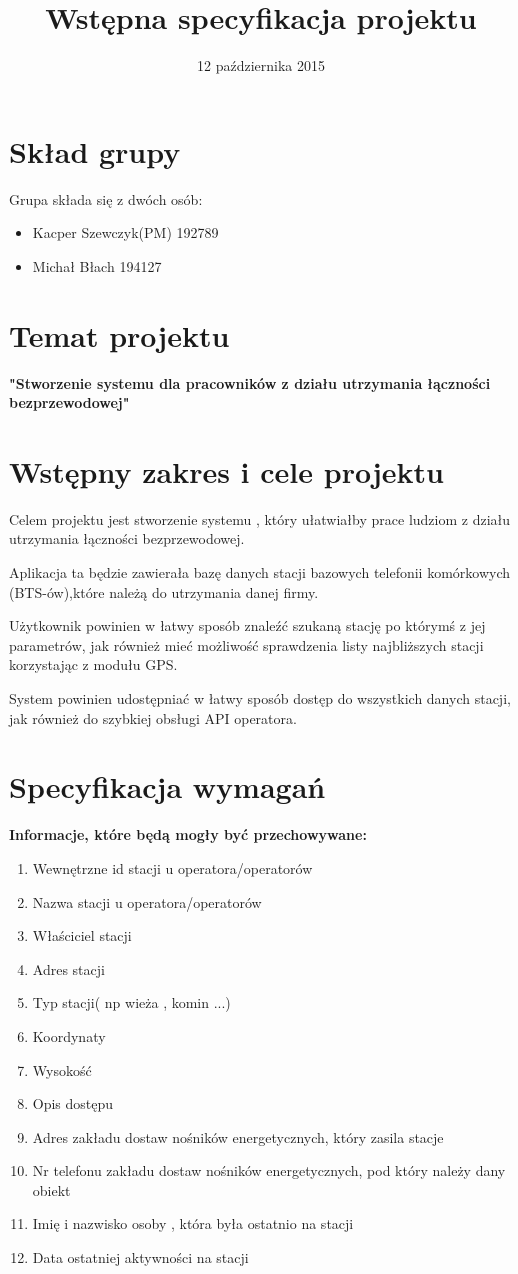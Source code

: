 \documentclass[12pt]{article}
\title{Wstępna specyfikacja projektu}
\date{12 października 2015}
\begin{document}
\maketitle

\section{Skład grupy}
Grupa składa się z dwóch osób:
\begin{itemize}
\item Kacper Szewczyk(PM) 192789
\item Michał Błach 194127
\end{itemize}
\section{Temat projektu}
\textbf{"Stworzenie systemu dla pracowników z działu utrzymania łączności bezprzewodowej"}
\section{Wstępny zakres i cele projektu}
Celem projektu jest stworzenie systemu , który ułatwiałby prace ludziom z działu utrzymania łączności bezprzewodowej.

Aplikacja ta będzie zawierała bazę danych stacji bazowych telefonii komórkowych (BTS-ów),które należą do utrzymania danej firmy.

Użytkownik powinien w łatwy sposób znaleźć szukaną stację po którymś z jej parametrów, jak również mieć możliwość sprawdzenia listy najbliższych stacji korzystając z modułu GPS.

System powinien udostępniać w łatwy sposób dostęp do wszystkich danych stacji, jak również do szybkiej obsługi API operatora.

\section{Specyfikacja wymagań}
\textbf{Informacje, które będą mogły być przechowywane:}
\begin{enumerate}
\item Wewnętrzne id stacji u operatora/operatorów
\item Nazwa stacji u operatora/operatorów 
\item Właściciel stacji
\item Adres stacji
\item Typ stacji( np wieża , komin ...)
\item Koordynaty
\item Wysokość
\item Opis dostępu
\item Adres zakładu dostaw nośników energetycznych, który zasila stacje
\item Nr telefonu zakładu dostaw nośników energetycznych, pod który należy dany obiekt
\item Imię i nazwisko osoby , która była ostatnio na stacji
\item Data ostatniej aktywności na stacji
\end{enumerate}
\end{document}

